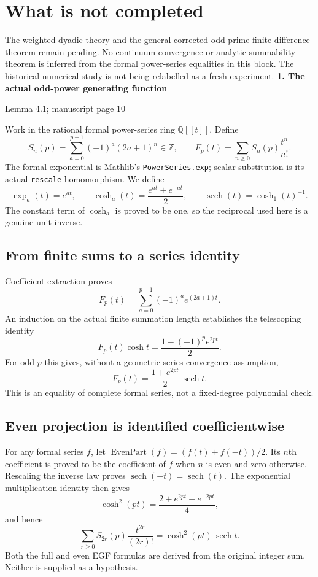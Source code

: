 \documentclass[11pt]{article}
\newcommand{\Q}{\mathbb Q}\newcommand{\Z}{\mathbb Z}\newcommand{\N}{\mathbb N}
\newcommand{\pageheading}[2]{{\Large\bfseries\color{ink}#1}\par{\small #2}\par\medskip}
\newcommand{\sech}{\operatorname{sech}}
\begin{document}
\section*{What is not completed}
The weighted dyadic theory and the general corrected odd-prime finite-difference theorem remain pending. No continuum convergence or analytic summability theorem is inferred from the formal power-series equalities in this block. The historical numerical study is not being relabelled as a fresh experiment.
\newpage
\pageheading{1. The actual odd-power generating function}{Lemma 4.1; manuscript page 10}
Work in the rational formal power-series ring $\Q[[t]]$. Define
\[
 S_n(p)=\sum_{a=0}^{p-1}(-1)^a(2a+1)^n\in\Z,
 \qquad F_p(t)=\sum_{n\ge0}S_n(p)\frac{t^n}{n!}.
\]
The formal exponential is Mathlib's \texttt{PowerSeries.exp}; scalar substitution is its actual \texttt{rescale} homomorphism. We define
\[
 \exp_a(t)=e^{at},\qquad
 \cosh_a(t)=\frac{e^{at}+e^{-at}}2,\qquad
 \sech(t)=\cosh_1(t)^{-1}.
\]
The constant term of $\cosh_a$ is proved to be one, so the reciprocal used here is a genuine unit inverse.

\subsection*{From finite sums to a series identity}
Coefficient extraction proves
\[
 F_p(t)=\sum_{a=0}^{p-1}(-1)^a e^{(2a+1)t}.
\]
An induction on the actual finite summation length establishes the telescoping identity
\[
 F_p(t)\cosh t=\frac{1-(-1)^p e^{2pt}}2.
\]
For odd $p$ this gives, without a geometric-series convergence assumption,
\[
 \boxed{F_p(t)=\frac{1+e^{2pt}}2\,\sech t.}
\]
This is an equality of complete formal series, not a fixed-degree polynomial check.

\subsection*{Even projection is identified coefficientwise}
For any formal series $f$, let $\operatorname{EvenPart}(f)=(f(t)+f(-t))/2$. Its $n$th coefficient is proved to be the coefficient of $f$ when $n$ is even and zero otherwise. Rescaling the inverse law proves $\sech(-t)=\sech(t)$. The exponential multiplication identity then gives
\[
 \cosh^2(pt)=\frac{2+e^{2pt}+e^{-2pt}}4,
\]
and hence
\[
 \boxed{\sum_{r\ge0}S_{2r}(p)\frac{t^{2r}}{(2r)!}
       =\cosh^2(pt)\,\sech t.}
\]
Both the full and even EGF formulas are derived from the original integer sum. Neither is supplied as a hypothesis.
\end{document}

